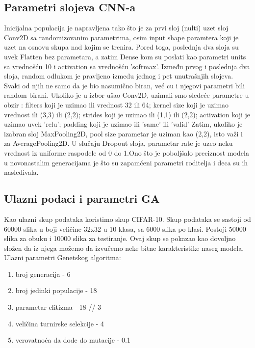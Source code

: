 \documentclass{article}
\begin{document}
\subsection{Parametri slojeva CNN-a}
Inicijalna populacija je napravljena tako što je za prvi sloj (nulti) uzet sloj Conv2D sa randomizovanim parametrima, osim input shape paramtera koji je uzet na osnovu skupa nad kojim se trenira. Pored toga, poslednja dva sloja su uvek Flatten bez parametara, a zatim Dense kom su poslati kao parametri units sa vrednošću 10 i activation sa vrednošću 'softmax'. Između prvog i poslednja dva sloja, random odlukom je pravljeno između jednog i pet unutrašnjih slojeva. Svaki od njih ne samo da je bio nasumično biran, već cu i njegovi parametri bili random birani.
Ukoliko je u izbor ušao Conv2D, uzimali smo sledeće parametre u obzir : filters koji je uzimao ili vrednost 32 ili 64; kernel size koji je uzimao vrednost ili (3,3) ili (2,2); strides koji je uzimao ili (1,1) ili (2,2); activation koji je uzimao uvek 'relu'; padding koji je uzimao ili 'same' ili 'valid'
Zatim, ukoliko je izabran sloj MaxPooling2D, pool size parametar je uziman kao (2,2), isto važi i za AveragePooling2D.
U slučaju Dropout sloja, parametar rate je uzeo neku vrednost iz uniforme raspodele od 0 do 1.Ono što je poboljšalo preciznost modela u novonastalim generacijama je što su zapamćeni parametri roditelja i deca su ih nasleđivala.

\subsection{Ulazni podaci i parametri GA}
Kao ulazni skup podataka koristimo skup CIFAR-10. Skup podataka se sastoji od 60000 slika u boji veličine 32x32 u 10 klasa, sa 6000 slika po klasi. Postoji 50000 slika za obuku i 10000 slika za testiranje. Ovaj skup se pokazao kao dovoljno složen da iz njega možemo da izvučemo neke bitne karakteristike naseg modela. \\

Ulazni parametri Genetskog algoritma: 

\begin{enumerate}
	\item  broj generacija - 6
	\item  broj jedinki populacije - 18
	\item  parametar elitizma - 18 // 3
	\item  veličina turnirske selekcije - 4
	\item  verovatnoća da dođe do mutacije -  0.1
\end{enumerate}
\end{document}

